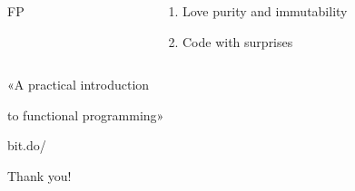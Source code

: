 \documentclass[aspectratio=169]{beamer}
\begin{document}
\begin{frame}
    \centering
\end{frame}

\begin{frame}

\end{frame}

\begin{frame}
\end{frame}

\begin{frame}
\end{frame}

\begin{frame}
\end{frame}

\begin{frame}
    \begin{columns}[c]
        \begin{column}[c]{2.5em}
            \HUGE
                FP
        \end{column}

        \begin{column}[c]{27em}
            \huge
                \begin{enumerate}[ leftmargin=0.5em
                                 , itemsep=1em
                                 , labelsep=0.1em
                                 , label=\color{gray}\Roman*
                                 ]
                    \item [\KeyWord{\Checkedbox}]\hspace{0.5em}Love purity and immutability
                    \item [\KeyWord{\Checkedbox}]\hspace{0.5em}Code with  surprises
                \end{enumerate}
        \end{column}
    \end{columns}
\end{frame}

\begin{frame}
    \centering
\end{frame}

\begin{frame} 
    \Huge{«A practical introduction}

    \Huge{\hspace{0.55em}to functional programming»}

    \vspace{1em}

    \Huge{bit.do/}
\end{frame}

\begin{frame}
    \centering
        \Huge{Thank you!}

\end{frame}
\end{document}
